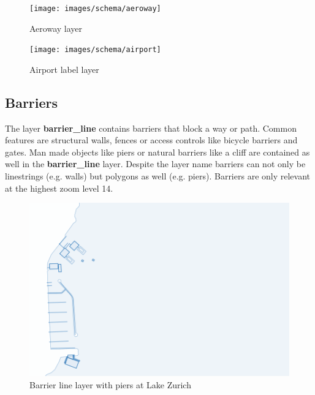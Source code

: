 \begin{figure}[H]
  \centering
  \texttt{[image: images/schema/aeroway]}
  \caption{Aeroway layer}
\end{figure}

\begin{figure}[H]
  \centering
  \texttt{[image: images/schema/airport]}
  \caption{Airport label layer}
\end{figure}

\subsection{Barriers}

\noindent\begin{minipage}[t]{0.48\linewidth}
    \vspace{0pt}
    The layer \textbf{barrier\_line} contains barriers that block a way or path. Common features are structural walls, fences or access controls like bicycle barriers and gates. Man made objects like piers or natural barriers like a cliff are contained as well in the \textbf{barrier\_line} layer. Despite the layer name barriers can not only be linestrings (e.g. walls) but polygons as well (e.g. piers). Barriers are only relevant at the highest zoom level 14.
\end{minipage}
\hfill
\begin{minipage}[t]{0.48\linewidth}
    \begin{figure}[H]
      \includegraphics[width=1\textwidth]{images/schema/piers_example}
      \caption{Barrier line layer with piers at Lake Zurich}
    \end{figure}
\end{minipage}

